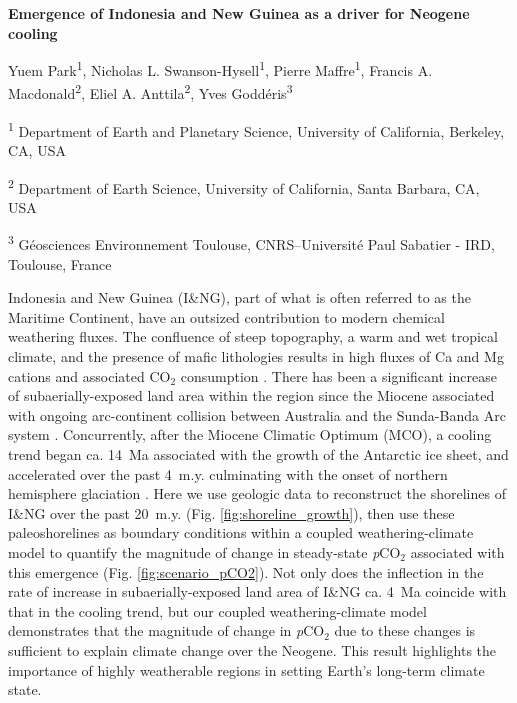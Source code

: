 \documentclass[11pt,letterpaper]{article}
\newcommand{\pCOtwo}{\textit{p}CO$_{2}$\xspace}
\newcommand{\COtwo}{CO$_{2}$\xspace}
\begin{document}
\begin{flushleft}
{\Large \textbf{Emergence of Indonesia and New Guinea as a driver for Neogene cooling}}

Yuem Park\textsuperscript{1},
Nicholas L. Swanson-Hysell\textsuperscript{1},
Pierre Maffre\textsuperscript{1},
Francis A. Macdonald\textsuperscript{2},
Eliel A. Anttila\textsuperscript{2},
Yves Godd\'eris\textsuperscript{3}

\bigskip
\textsuperscript{1} Department of Earth and Planetary Science, University of California, Berkeley, CA, USA

\textsuperscript{2} Department of Earth Science, University of California, Santa Barbara, CA, USA

\textsuperscript{3} G\'eosciences Environnement Toulouse, CNRS--Universit\'e Paul Sabatier - IRD, Toulouse, France

\bigskip

\end{flushleft}

\linenumbers

Indonesia and New Guinea (I\&NG), part of what is often referred to as the Maritime Continent, have an outsized contribution to modern chemical weathering fluxes. The confluence of steep topography, a warm and wet tropical climate, and the presence of mafic lithologies results in high fluxes of Ca and Mg cations and associated \COtwo consumption \citep{Gaillardet1999a, Hartmann2009a, Milliman2013a, Hartmann2014a}. There has been a significant increase of subaerially-exposed land area within the region since the Miocene associated with ongoing arc-continent collision between Australia and the Sunda-Banda Arc system \citep{Molnar2015a, Hall2017a, Macdonald2019a}. Concurrently, after the Miocene Climatic Optimum (MCO), a cooling trend began ca. 14~Ma associated with the growth of the Antarctic ice sheet, and accelerated over the past 4~m.y. culminating with the onset of northern hemisphere glaciation \citep{Shackleton1984a, Zachos2001a}. Here we use geologic data to reconstruct the shorelines of I\&NG over the past 20~m.y. (Fig. \ref{fig:shoreline_growth}), then use these paleoshorelines as boundary conditions within a coupled weathering-climate model to quantify the magnitude of change in steady-state \pCOtwo associated with this emergence (Fig. \ref{fig:scenario_pCO2}). Not only does the inflection in the rate of increase in subaerially-exposed land area of I\&NG ca. 4~Ma coincide with that in the cooling trend, but our coupled weathering-climate model demonstrates that the magnitude of change in \pCOtwo due to these changes is sufficient to explain climate change over the Neogene. This result highlights the importance of highly weatherable regions in setting Earth's long-term climate state.
\end{document}
